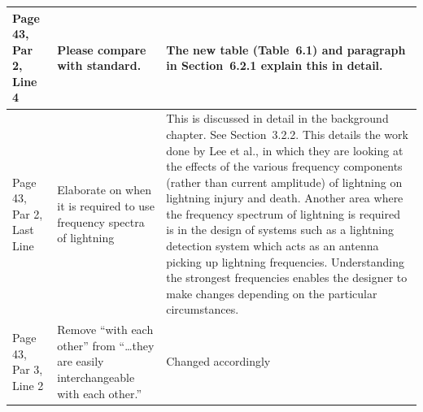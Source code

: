 \documentclass[11pt,a4paper]{letter} %
\begin{document}
\begin{tabularx}{6.5in}{X|p{}|p{}}
	Page 43, Par 2, Line 4 & Please compare with standard. & The new table (Table~6.1) and paragraph in Section~6.2.1 explain this in detail. \\ \hline
	Page 43, Par 2, Last Line & Elaborate on when it is required to use frequency spectra of lightning & This is discussed in detail in the background chapter. See Section~3.2.2. This details the work done by Lee et al., in which they are looking at the effects of the various frequency components (rather than current amplitude) of lightning on lightning injury and death. Another area where the frequency spectrum of lightning is required is in the design of systems such as a lightning detection system which acts as an antenna picking up lightning frequencies. Understanding the strongest frequencies enables the designer to make changes depending on the particular circumstances. \\ \hline
	Page 43, Par 3, Line 2 & Remove ``with each other'' from ``\ldots they are easily interchangeable with each other.'' & Changed accordingly \\ \hline
\end{tabularx}
\end{document}
